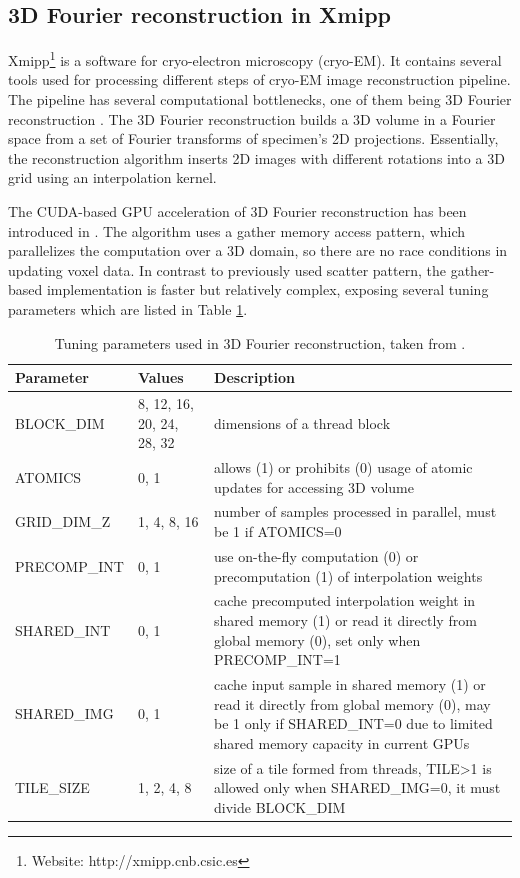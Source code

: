 \documentclass
[
    digital, %
    oneside, %
    table, %
    nolof, %
    nolot, %
    nocover %
]{fithesis3}
\begin{document}
\subsection{3D Fourier reconstruction in Xmipp}
Xmipp\footnote{Website: http://xmipp.cnb.csic.es} is a software for cryo-electron microscopy (cryo-EM). It contains several tools used for processing
different steps of cryo-EM image reconstruction pipeline. The pipeline has several computational bottlenecks, one of them being 3D Fourier reconstruction
\cite{cryoem-source}. The 3D Fourier reconstruction builds a 3D volume in a Fourier space from a set of Fourier transforms of specimen's 2D projections.
Essentially, the reconstruction algorithm inserts 2D images with different rotations into a 3D grid using an interpolation kernel.

The CUDA-based GPU acceleration of 3D Fourier reconstruction has been introduced in \cite{cryoem-example}. The algorithm uses a gather memory access
pattern, which parallelizes the computation over a 3D domain, so there are no race conditions in updating voxel data. In contrast to previously used
scatter pattern, the gather-based implementation is faster but relatively complex, exposing several tuning parameters which are listed in Table
\ref{fourier_tuning_parameters}.

\begin{table}
\begin{center}
    \begin{tabular}{|l|p{2cm}|p{7cm}|}
    \hline
    Parameter & Values & Description \\
    \hline
    BLOCK\_DIM & 8, 12, 16, 20, 24, 28, 32 & dimensions of a thread block \\
    ATOMICS & 0, 1 & allows (1) or prohibits (0) usage of atomic updates for accessing 3D volume \\
    GRID\_DIM\_Z & 1, 4, 8, 16 & number of samples processed in parallel, must be 1 if ATOMICS=0 \\
    PRECOMP\_INT & 0, 1 & use on-the-fly computation (0) or precomputation (1) of interpolation weights \\
    SHARED\_INT & 0, 1 & cache precomputed interpolation weight in shared memory (1) or read it directly from global memory (0), set only when PRECOMP\_INT=1 \\
    SHARED\_IMG & 0, 1 & cache input sample in shared memory (1) or read it directly from global memory (0), may be 1 only if SHARED\_INT=0 due to limited shared memory capacity in current GPUs \\
    TILE\_SIZE & 1, 2, 4, 8 & size of a tile formed from threads, TILE\textgreater 1 is allowed only when SHARED\_IMG=0, it must divide BLOCK\_DIM \\
    \hline
    \end{tabular}
\end{center}
\caption{Tuning parameters used in 3D Fourier reconstruction, taken from \cite{cryoem-example}.}
\label{fourier_tuning_parameters}
\end{table}
\end{document}
